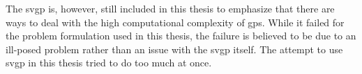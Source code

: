 The \acrshort{svgp} is, however, still included in this thesis to emphasize that there are ways to deal with the high computational complexity of \acrshort{gp}s. While it failed for the problem formulation used in this thesis, the failure is believed to be due to an ill-posed problem rather than an issue with the \acrshort{svgp} itself. The attempt to use \acrshort{svgp} in this thesis tried to do too much at once.